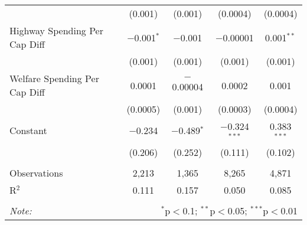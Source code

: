 \begin{table}[!htbp]
\begin{tabular}{@{\extracolsep{5pt}}lcccc}
  & (0.001) & (0.001) & (0.0004) & (0.0004) \\ 
  Highway Spending Per Cap Diff & $-$0.001$^{*}$ & $-$0.001 & $-$0.00001 & 0.001$^{**}$ \\ 
  & (0.001) & (0.001) & (0.001) & (0.001) \\ 
  Welfare Spending Per Cap Diff & 0.0001 & $-$0.00004 & 0.0002 & 0.001 \\ 
  & (0.0005) & (0.001) & (0.0003) & (0.0004) \\ 
  Constant & $-$0.234 & $-$0.489$^{*}$ & $-$0.324$^{***}$ & 0.383$^{***}$ \\ 
  & (0.206) & (0.252) & (0.111) & (0.102) \\ 
 \hline \\[-1.8ex] 
Observations & 2,213 & 1,365 & 8,265 & 4,871 \\ 
R$^{2}$ & 0.111 & 0.157 & 0.050 & 0.085 \\ 
\hline 
\hline \\[-1.8ex] 
\textit{Note:}  & \multicolumn{4}{r}{$^{*}$p$<$0.1; $^{**}$p$<$0.05; $^{***}$p$<$0.01} \\ 
\end{tabular} 
\end{table} 
